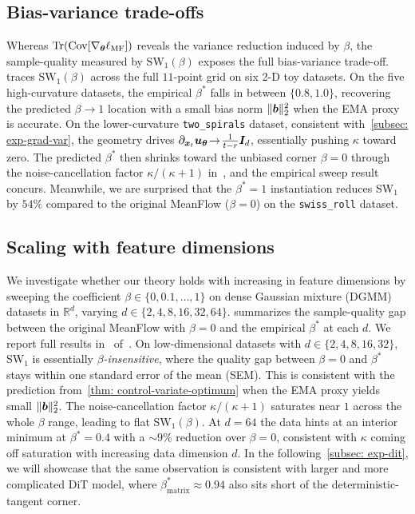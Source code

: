 \subsection{Bias-variance trade-offs}
\label{subsec: exp-m-beta}

Whereas $\operatorname{Tr}(\mathrm{Cov}[\nabla_{{\bm{\theta}}}\ell_{\text{MF}}])$ reveals the variance reduction induced by $\beta$, the sample-quality measured by $\mathrm{SW}_{1}(\beta)$ exposes the full bias-variance trade-off.  traces $\mathrm{SW}_{1}(\beta)$ across the full $11$-point grid on six 2-D toy datasets. On the five high-curvature datasets, the empirical $\beta^{\ast}$ falls in between $\{0.8,1.0\}$, recovering the predicted $\beta\!\to\!1$ location with a small bias norm $\|{\bm{b}}\|_{2}^{2}$ when the EMA proxy is accurate. On the lower-curvature \texttt{two\_spirals} dataset, consistent with~\cref{subsec: exp-grad-var}, the geometry drives $\partial_{{\bm{x}}_{t}}{\bm{u}}_{{\bm{\theta}}}\!\to\!\frac{1}{t-r}{\bm{I}}_{d}$, essentially pushing $\kappa$ toward zero. The predicted $\beta^{\ast}$ then shrinks toward the unbiased corner $\beta\!=\!0$ through the noise-cancellation factor $\kappa/(\kappa{+}1)$ in~, and the empirical sweep result concurs. Meanwhile, we are surprised that the $\beta^{\ast}=1$ instantiation reduces SW$_{1}$ by $54\%$ compared to the original MeanFlow ($\beta=0$) on the \texttt{swiss\_roll} dataset.



\subsection{Scaling with feature dimensions}
\label{subsec: exp-dgmm}

We investigate whether our theory holds with increasing in feature dimensions by sweeping the coefficient $\beta\!\in\!\{0,0.1,\dots,1\}$ on dense Gaussian mixture (DGMM) datasets in $\mathbb{R}^{d}$, varying $d\!\in\!\{2,4,8,16,32,64\}$.  summarizes the sample-quality gap between the original MeanFlow with $\beta\!=\!0$ and the empirical $\beta^{\ast}$ at each $d$. We report full results in~ of~. On low-dimensional datasets with $d\!\in\!\{2,4,8,16,32\}$, SW$_{1}$ is essentially \emph{$\beta$-insensitive}, where the quality gap between $\beta\!=\!0$ and $\beta^{\ast}$ stays within one standard error of the mean (SEM). This is consistent with the prediction from~\cref{thm: control-variate-optimum} when the EMA proxy yields small $\|{\bm{b}}\|_{2}^{2}$. The noise-cancellation factor $\kappa/(\kappa{+}1)$ saturates near $1$ across the whole $\beta$ range, leading to flat SW$_{1}(\beta)$. At $d\!=\!64$ the data hints at an interior minimum at $\beta^{\ast}\!=\!0.4$ with a $\sim\!9\%$ reduction over $\beta\!=\!0$, consistent with $\kappa$ coming off saturation with increasing data dimension $d$. In the following~\cref{subsec: exp-dit}, we will showcase that the same observation is consistent with larger and more complicated DiT model, where $\beta^{\ast}_{\mathrm{matrix}}\!\approx\!0.94$ also sits short of the deterministic-tangent corner.

